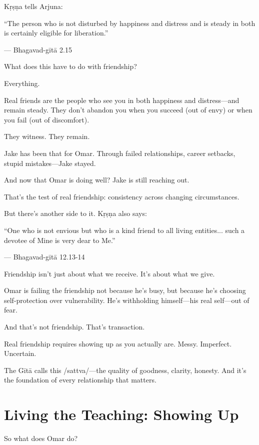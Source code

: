 \documentclass[11pt,twoside]{book}
\begin{document}
Kṛṣṇa tells Arjuna:

\begin{pullquote}
``The person who is not disturbed by happiness and distress and is steady in both is certainly eligible for liberation.''

--- Bhagavad-gītā 2.15
\end{pullquote}

What does this have to do with friendship?

Everything.

Real friends are the people who see you in both happiness and distress—and remain steady. They don't abandon you when you succeed (out of envy) or when you fail (out of discomfort).

They witness. They remain.

Jake has been that for Omar. Through failed relationships, career setbacks, stupid mistakes—Jake stayed.

And now that Omar is doing well? Jake is still reaching out.

That's the test of real friendship: consistency across changing circumstances.

But there's another side to it. Kṛṣṇa also says:

\begin{pullquote}
``One who is not envious but who is a kind friend to all living entities... such a devotee of Mine is very dear to Me.''

--- Bhagavad-gītā 12.13-14
\end{pullquote}

Friendship isn't just about what we receive. It's about what we give.

Omar is failing the friendship not because he's busy, but because he's choosing self-protection over vulnerability. He's withholding himself—his real self—out of fear.

And that's not friendship. That's transaction.

Real friendship requires showing up as you actually are. Messy. Imperfect. Uncertain.

The Gītā calls this /sattva/—the quality of goodness, clarity, honesty. And it's the foundation of every relationship that matters.

\section*{Living the Teaching: Showing Up}

So what does Omar do?
\end{document}
